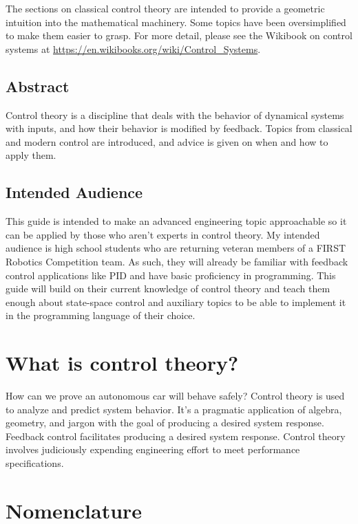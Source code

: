 \documentclass[10pt,conference,compsoc]{IEEEtran}
\begin{document}
The sections on classical control theory are intended to provide a geometric
intuition into the mathematical machinery. Some topics have been oversimplified
to make them easier to grasp. For more detail, please see the Wikibook on
control systems at \url{https://en.wikibooks.org/wiki/Control_Systems}.

\subsection{Abstract}

Control theory is a discipline that deals with the behavior of dynamical
\glspl{system} with inputs, and how their behavior is modified by feedback.
Topics from classical and modern control are introduced, and advice is given on
when and how to apply them.

\subsection{Intended Audience}

This guide is intended to make an advanced engineering topic approachable so it
can be applied by those who aren't experts in control theory. My intended
audience is high school students who are returning veteran members of a FIRST
Robotics Competition team. As such, they will already be familiar with feedback
control applications like PID and have basic proficiency in programming. This
guide will build on their current knowledge of control theory and teach them
enough about state-space control and auxiliary topics to be able to implement it
in the programming language of their choice.

\section{What is control theory?}

How can we prove an autonomous car will behave safely? Control theory is used to
analyze and predict \gls{system} behavior. It's a pragmatic application of
algebra, geometry, and jargon with the goal of producing a desired \gls{system}
response. Feedback control facilitates producing a desired \gls{system}
response. Control theory involves judiciously expending engineering effort to
meet performance specifications.

\section{Nomenclature}
\end{document}
